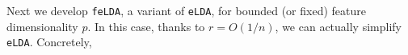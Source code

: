 \documentclass[12pt]{article}
\numberwithin{equation}{section}
\theoremstyle{remark}
\newcommand{\1}{{\rm 1}\kern-0.24em{\rm I}}
\begin{document}
Next we develop \verb+feLDA+, a variant of \verb+eLDA+, for bounded (or fixed) feature dimensionality $p$. In this case, thanks to  $r=O(1/n)$, we can actually simplify \verb+eLDA+.
Concretely,
\end{document}
